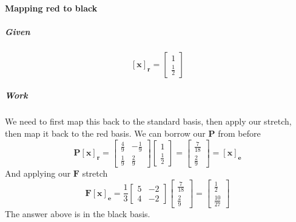 \documentclass{article}
\begin{document}
            \paragraph{Mapping red to black}
                \subparagraph{Given}
                    \[
                        [\mathbf{x}]_{\mathbf{r}}
                        =
                        \begin{bmatrix}
                            1\\\frac{1}{2}    
                        \end{bmatrix}
                    \]
                \subparagraph{Work}
                    We need to first map this back to the standard basis, then apply our stretch,
                    then map it back to the red basis. We can borrow our $\mathbf{P}$ from before
                    \[
                        \mathbf{P}[\mathbf{x}]_{\mathbf{r}}=
                        \begin{bmatrix}
                            \frac{4}{9} & -\frac{1}{9} \\
                            \frac{1}{9} & \frac{2}{9}
                        \end{bmatrix}
                        \begin{bmatrix}
                            1\\\frac{1}{2}
                        \end{bmatrix}
                        =
                        \begin{bmatrix}
                            \frac{7}{18}\\\frac{2}{9}
                        \end{bmatrix}
                        =
                        [\mathbf{x}]_{\mathbf{e}}
                    \]
                    And applying our $\mathbf{F}$ stretch
                    \[
                        \mathbf{F}[\mathbf{x}]_{\mathbf{e}}=
                        \frac{1}{3}\begin{bmatrix}5 & -2 \\ 4 & -2\end{bmatrix}
                        \begin{bmatrix}
                            \frac{7}{18}\\\frac{2}{9}
                        \end{bmatrix}
                        =
                        \begin{bmatrix}
                            \frac{1}{2}\\ \frac{10}{27}
                        \end{bmatrix}
                    \]
                    The answer above is in the black basis.
\end{document}
